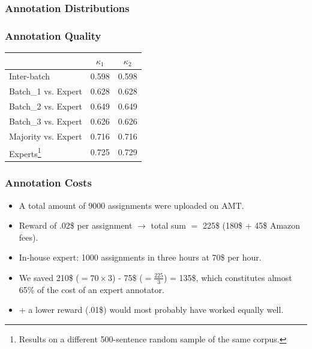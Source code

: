 \documentclass[10pt]{beamer}
\newenvironment{itemwide}%
{\begin{itemize}%
    \setlength{\itemsep}{5pt}%
    \setlength{\parskip}{5pt}}%
  {\end{itemize}}
\begin{document}
\begin{frame}
  \frametitle{Annotation Distributions}
  \begin{center}
  \end{center}
\end{frame}

\begin{frame}
  \frametitle{Annotation Quality}
\begin{center}
\begin{tabular}{|l|c|c|}
\hline
& $\kappa_{1}$ & $\kappa_{2}$ \\ 
\hline
Inter-batch & 0.598 & 0.598 \\ \hline
Batch\_1 vs. Expert & 0.628 & 0.628\\
Batch\_2 vs. Expert & 0.649 & 0.649\\
Batch\_3 vs. Expert & 0.626 & 0.626\\ \hline
Majority vs. Expert & 0.716 & 0.716\\ \hline
Experts\footnote{Results on a different 500-sentence random sample of the same corpus.} & 0.725 & 0.729\\ \hline
\end{tabular}
\end{center}
\end{frame}

\begin{frame}
  \frametitle{Annotation Costs}
\begin{itemwide}
 \item A total amount of 9000 assignments were uploaded on AMT.
 \item Reward of .02\$ per assignment $\rightarrow$ total sum $=$ 225\$ (180\$ + 45\$ Amazon fees).
 \item In-house expert: 1000 assignments in three hours at 70\$ per hour.
 \item We saved 210\$ ($= 70 \times 3$) - 75\$ ($ = \frac{225}{3}$) = 135\$, which constitutes almost 65\% of the cost of an expert annotator.
 \item + a lower reward (.01\$) would most probably have worked equally well.
\end{itemwide}

\end{frame}
\end{document}
